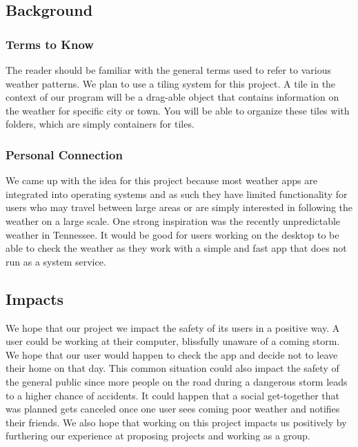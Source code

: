 \documentclass[10pt,conference,onecolumn,compsoc]{IEEEtran}
\begin{document}
\subsection{Background}
\subsubsection{Terms to Know}
	The reader should be familiar with the general terms used to refer to various weather patterns. We plan to use a tiling system for this project. A tile in the context of our program will be a drag-able object that contains information on the weather for specific city or town.
You will be able to organize these tiles with folders, which are simply containers for tiles. 
\subsubsection{Personal Connection}	
	 We came up with the idea for this project because most weather apps are integrated into operating systems and as such they have limited functionality for users who may travel between large areas or are simply interested in following the weather on a large scale. One strong inspiration was the recently unpredictable weather in Tennessee. It would be good for users working on the desktop to be able to check the weather as they work with a simple and fast app that does not run as a system service. 


\subsection{Impacts}
We hope that our project we impact the safety of its users in a positive way. A user could be working at their computer, blissfully unaware of a coming storm. We hope that our user would happen to check the app and decide not to leave their home on that day. This common situation could also impact the safety of the general public since more people on the road during a dangerous storm leads to a higher chance of accidents. It could happen that a social get-together that was planned gets canceled once one user sees coming poor weather and notifies their friends. We also hope that working on this project impacts us positively by furthering our experience at proposing projects and working as a group.  	
\end{document}
